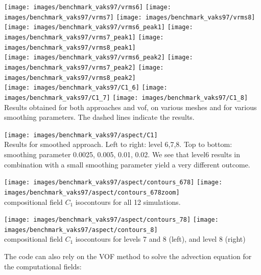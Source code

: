 \begin{itemize}
\begin{minipage}{.99\linewidth}
\begin{center}
\texttt{[image: images/benchmark\_vaks97/vrms6]}
\texttt{[image: images/benchmark\_vaks97/vrms7]}
\texttt{[image: images/benchmark\_vaks97/vrms8]}\\
\texttt{[image: images/benchmark\_vaks97/vrms6\_peak1]}
\texttt{[image: images/benchmark\_vaks97/vrms7\_peak1]}
\texttt{[image: images/benchmark\_vaks97/vrms8\_peak1]}\\
\texttt{[image: images/benchmark\_vaks97/vrms6\_peak2]}
\texttt{[image: images/benchmark\_vaks97/vrms7\_peak2]}
\texttt{[image: images/benchmark\_vaks97/vrms8\_peak2]}\\
\texttt{[image: images/benchmark\_vaks97/C1\_6]}
\texttt{[image: images/benchmark\_vaks97/C1\_7]}
\texttt{[image: images/benchmark\_vaks97/C1\_8]}\\
{\captionfont Results obtained for both approaches and vof, on various meshes and for 
various smoothing parameters. The dashed lines indicate the  results.}
\end{center}
\end{minipage}


\begin{center}
\texttt{[image: images/benchmark\_vaks97/aspect/C1]}\\
{\captionfont Results for smoothed approach. Left to right: level 6,7,8. Top to bottom: smoothing 
parameter 0.0025, 0.005, 0.01, 0.02. We see that level6 results in combination with a small smoothing parameter
yield a very different outcome.}
\end{center}

\begin{center}
\texttt{[image: images/benchmark\_vaks97/aspect/contours\_678]}
\texttt{[image: images/benchmark\_vaks97/aspect/contours\_678zoom]}\\
{ compositional field $C_1$ isocontours for all 12 simulations.} 
\end{center}

\begin{center}
\texttt{[image: images/benchmark\_vaks97/aspect/contours\_78]}
\texttt{[image: images/benchmark\_vaks97/aspect/contours\_8]}\\
{ compositional field $C_1$ isocontours for levels 7 and 8 (left), 
and level 8 (right)} 
\end{center}


\newpage
The code can also rely on the VOF method to solve the advection equation 
for the computational fields:


\end{itemize}
